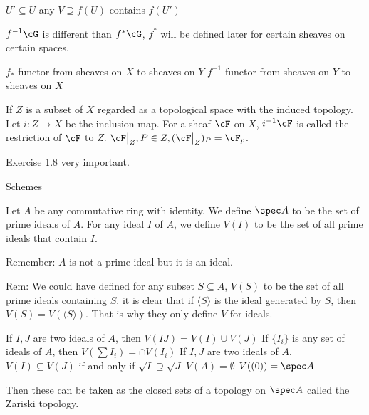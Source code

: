 $U' \subseteq U$ any $V \supseteq f(U)$ contains $f(U')$

$f^{-1} \cG$ is different than $f^*\cG$, $f^*$ will be defined later for certain sheaves on certain spaces. 






$f_*$ functor from sheaves on $X$ to sheaves on $Y$
$f^{-1}$ functor from sheaves on $Y$ to sheaves on $X$


\begin{dfn}
If $Z$ is a subset of $X$ regarded as a topological space with the induced topology. Let $i: Z \to X$ be the inclusion map. For a sheaf $\cF$ on $X$, $i^{-1}\cF$ is called the restriction of $\cF$ to $Z$.
$\cF\big|_Z, P \in Z, (\cF\big|_Z)_P= \cF_p$.
\end{dfn}



Exercise 1.8 very important. 




Schemes

\begin{dfn}
Let $A$ be any commutative ring with identity. We define $\spec A$ to be the set of prime ideals of $A$. For any ideal $I$ of $A$, we define $V(I)$ to be the set of all prime ideals that contain $I$.
\end{dfn}

Remember: $A$ is not a prime ideal but it is an ideal.


Rem: We could have defined for any subset $S \subseteq A$, $V(S)$ to be the set of all prime ideals containing $S$. it is clear that if $\langle S \rangle$ is the ideal generated by $S$, then $V(S)= V(\langle S \rangle)$. That is why they only define $V$ for ideals.


\begin{lem}
If $I, J$ are two ideals of $A$, then $V(IJ)= V(I)  \cup V(J)$
If $\{I_i\}$ is any set of ideals of $A$, then $V(\sum I_i)= \cap V(I_i)$
If $I,J$ are two ideals of $A$, $V(I) \subseteq V(J)$ if and only if $\sqrt{I} \supseteq \sqrt{J}$
$V(A)= \emptyset$
$V((0))= \spec A$
\end{lem}


Then these can be taken as the closed sets of a topology on $\spec A$ called the Zariski topology. 















